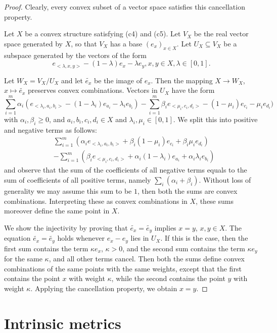 \documentclass[12pt,letterpaper]{article}
\begin{document}
\begin{proof} Clearly, every convex subset of a vector space satisfies this cancellation property.

Let $X$ be a convex structure satisfying (c4) and (c5). Let $V_X$ be the real vector space generated by $X$, so that $V_X$ has a base $(e_x)_{x\in X}$.
Let $U_X\subseteq V_X$ be a subspace generated by the vectors of the form
\[
 e_{<\lambda,x,y>}-(1-\lambda)e_x-\lambda e_y,  x,y\in X, \lambda \in [0,1].
\]

Let $W_X=V_X/U_X$ and let $\tilde{e_x}$ be the image of $e_x$. Then the mapping  $X \to W_X$, $x\mapsto \tilde{e_x}$ preserves convex combinations.
Vectors in $U_X$ have the form
\[
\sum_{i=1}^m \alpha_i(e_{<\lambda_i,a_i,b_i>}-(1-\lambda_i)e_{a_i}-\lambda_ie_{b_i})-\sum_{i=1}^m\beta_ie_{<\mu_i,c_i,d_i>}-(1-\mu_i)e_{c_i}-\mu_ie_{d_i})
\]
with  $\alpha_i,\beta_i\geq 0$, and $a_i,b_i,c_i,d_i\in X$ and $\lambda_i,\mu_i\in[0,1]$.
We split this into positive and negative terms as follows:
\begin{eqnarray*}
&\sum_{i=1}^m(\alpha_ie_{<\lambda_i,a_i,b_i>}+\beta_i(1-\mu_i)e_{c_i} +\beta_i\mu_ie_{d_i})\\  &-\sum_{i=1}^m(\beta_ie_{<\mu_i,c_i,d_i>}+\alpha_i(1-\lambda_i)e_{a_i}+\alpha_i\lambda_ie_{b_i})
\end{eqnarray*}
and observe that the sum of the coefficients of all negative terms equals to the sum of coefficients of all positive terms,
namely $\sum_i(\alpha_i+\beta_i)$. Without loss of generality we may assume  this sum to be $1$, then both the sums are convex combinations.  Interpreting these as convex combinations in $X$, these sums moreover define the same point in $X$.

We show the injectivity by proving that $\tilde{e_x}=\tilde{e_y}$ implies $x=y$, $x,y\in X$. The equation $\tilde{e_x}=\tilde{e_y}$ holds whenever $e_x-e_y$ lies in $U_X$.
If this is the case, then the first sum contains the term $\kappa e_x$, $\kappa >0$, and the second sum contains the term $\kappa e_y$ for the same $\kappa$, and all other terms cancel. Then both the sums define convex combinations of the same points with the same weights, except that the first contains the point $x$ with weight $\kappa$, while the second contains the point $y$ with weight $\kappa$. Applying the cancellation property, we obtain $x=y$.
\end{proof}


\section{Intrinsic metrics}
\end{document}
